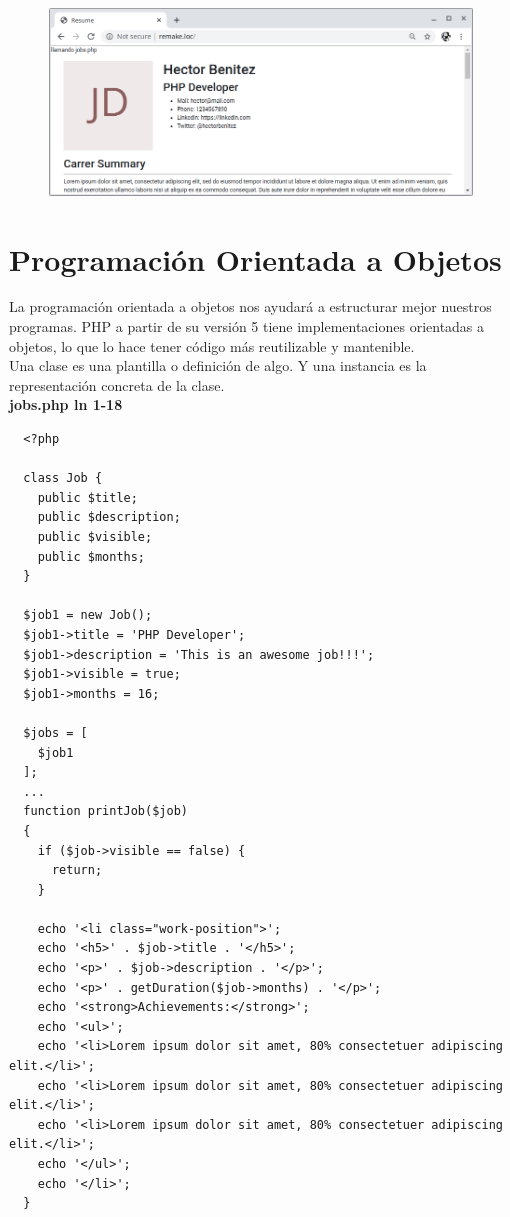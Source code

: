 \documentclass{article}
\begin{document}
\begin{figure}[h!]
  \centering
  \includegraphics[scale=0.5]{./Pictures/042_require_doble.png}
\end{figure}


\section{Programación Orientada a Objetos}%
La programación orientada a objetos nos ayudará a estructurar mejor nuestros
programas. PHP a partir de su versión 5 tiene implementaciones orientadas a
objetos, lo que lo hace tener código más reutilizable y mantenible.\\

Una clase es una plantilla o definición de algo. Y una instancia es la
representación concreta de la clase.\\

\textbf{jobs.php ln 1-18}
\begin{verbatim}
  <?php

  class Job {
    public $title;
    public $description;
    public $visible;
    public $months;
  }

  $job1 = new Job();
  $job1->title = 'PHP Developer';
  $job1->description = 'This is an awesome job!!!';
  $job1->visible = true;
  $job1->months = 16;

  $jobs = [
    $job1
  ];
  ...
  function printJob($job)
  {
    if ($job->visible == false) {
      return;
    }

    echo '<li class="work-position">';
    echo '<h5>' . $job->title . '</h5>';
    echo '<p>' . $job->description . '</p>';
    echo '<p>' . getDuration($job->months) . '</p>';
    echo '<strong>Achievements:</strong>';
    echo '<ul>';
    echo '<li>Lorem ipsum dolor sit amet, 80% consectetuer adipiscing elit.</li>';
    echo '<li>Lorem ipsum dolor sit amet, 80% consectetuer adipiscing elit.</li>';
    echo '<li>Lorem ipsum dolor sit amet, 80% consectetuer adipiscing elit.</li>';
    echo '</ul>';
    echo '</li>';
  }
\end{verbatim}
\end{document}
